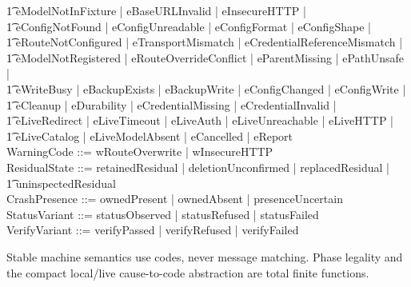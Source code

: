 \documentclass{article}
\begin{document}
\begin{zed}
	\t1 eModelNotInFixture | eBaseURLInvalid | eInsecureHTTP | \\
	\t1 eConfigNotFound | eConfigUnreadable | eConfigFormat | eConfigShape | \\
	\t1 eRouteNotConfigured | eTransportMismatch | eCredentialReferenceMismatch | \\
	\t1 eModelNotRegistered | eRouteOverrideConflict | eParentMissing | ePathUnsafe | \\
	\t1 eWriteBusy | eBackupExists | eBackupWrite | eConfigChanged | eConfigWrite | \\
	\t1 eCleanup | eDurability | eCredentialMissing | eCredentialInvalid | \\
	\t1 eLiveRedirect | eLiveTimeout | eLiveAuth | eLiveUnreachable | eLiveHTTP | \\
	\t1 eLiveCatalog | eLiveModelAbsent | eCancelled | eReport \\
	WarningCode ::= wRouteOverwrite | wInsecureHTTP \\
	ResidualState ::= retainedResidual | deletionUnconfirmed | replacedResidual | \\
	\t1 uninspectedResidual \\
	CrashPresence ::= ownedPresent | ownedAbsent | presenceUncertain \\
	StatusVariant ::= statusObserved | statusRefused | statusFailed \\
	VerifyVariant ::= verifyPassed | verifyRefused | verifyFailed
\end{zed}

Stable machine semantics use codes, never message matching.  Phase legality and
the compact local/live cause-to-code abstraction are total finite functions.
\end{document}
